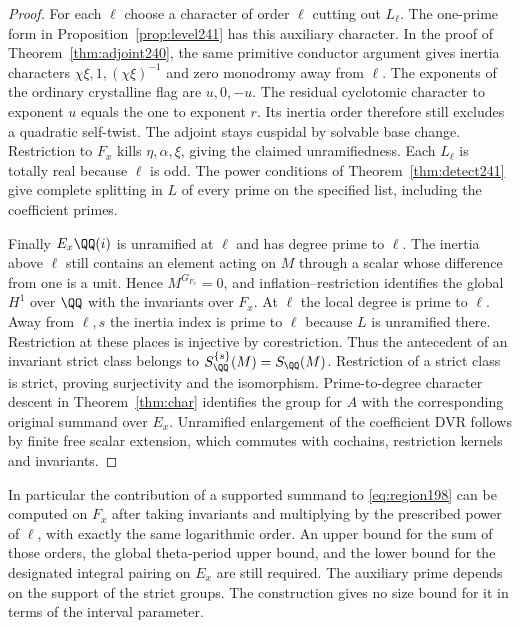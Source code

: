 \documentclass[a4paper,11pt]{article}
\theoremstyle{definition}
\theoremstyle{remark}
\numberwithin{equation}{section}
\begin{document}
\begin{proof}
For each \(\ell\) choose a character of order \(\ell\)
cutting out \(L_\ell\). The one-prime form in
Proposition~\ref{prop:level241} has this auxiliary character.
In the proof of Theorem~\ref{thm:adjoint240}, the same
primitive conductor argument gives inertia characters
\(\chi\xi,1,(\chi\xi)^{-1}\) and zero monodromy away from
\(\ell\). The exponents of the ordinary crystalline flag
are \(u,0,-u\). The residual cyclotomic character to exponent
\(u\) equals the one to exponent \(r\). Its inertia order
therefore still excludes a quadratic self-twist.
The adjoint stays cuspidal
by solvable base change. Restriction to \(F_x\) kills
\(\eta,\alpha,\xi\), giving the claimed unramifiedness.
Each \(L_\ell\) is totally real because \(\ell\) is odd.
The power conditions of Theorem~\ref{thm:detect241} give
complete splitting in \(L\) of every prime on the specified
list, including the coefficient primes.

Finally \(E_x\QQ(i)\) is unramified at \(\ell\) and has
degree prime to \(\ell\). The inertia above \(\ell\) still
contains an element acting on \(M\) through a scalar whose
difference from one is a unit. Hence \(M^{G_{F_x}}=0\),
and inflation--restriction identifies the global \(H^1\)
over \(\QQ\) with the invariants over \(F_x\). At \(\ell\)
the local degree is prime to \(\ell\). Away from \(\ell,s\)
the inertia index is prime to \(\ell\) because \(L\) is
unramified there. Restriction at these places is injective
by corestriction. Thus the antecedent of an invariant strict
class belongs to \(S_\QQ^{\{s\}}(M)=S_\QQ(M)\).
Restriction of a strict class is strict, proving surjectivity
and the isomorphism. Prime-to-degree character descent in
Theorem~\ref{thm:char} identifies the group for \(A\) with
the corresponding original summand over \(E_x\).
Unramified enlargement of the coefficient DVR follows by
finite free scalar extension, which commutes with cochains,
restriction kernels and invariants.
\end{proof}

In particular the contribution of a supported summand to
\eqref{eq:region198} can be computed on \(F_x\) after taking
invariants and multiplying by the prescribed power of \(\ell\),
with exactly the same logarithmic order. An upper bound for the
sum of those orders, the global theta-period upper bound, and
the lower bound for the designated integral pairing on \(E_x\)
are still required. The auxiliary prime depends on the support
of the strict groups. The construction gives no size bound
for it in terms of the interval parameter.
\end{document}
